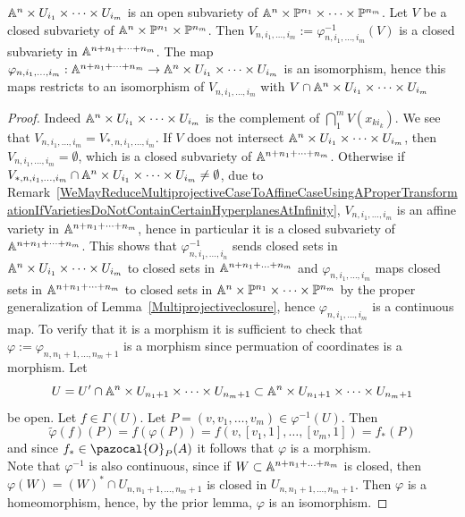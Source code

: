     \begin{lemma}\label{IdentificationOfAffineCoverOfMultiprojectiveSpaceWithAffineSpaceIsIsomorphism}
        $\mathbb{A}^n\times U_{i_1}\times \cdots\times U_{i_m}$ is an open subvariety of $\mathbb{A}^n\times \mathbb{P}^{n_1}\times \cdots \times \mathbb{P}^{n_m}$. Let $V$ be a closed subvariety of $\mathbb{A}^n\times \mathbb{P}^{n_1}\times \mathbb{P}^{n_m}$. Then $V_{n,i_1,\dots,i_m} := \varphi_{n,i_1,\dots,i_m}^{-1}(V)$ is a closed subvariety in $\A^{n+n_1+\dots+n_m}$. The map $\varphi_{n,i_1,\dots,i_m} : \mathbb{A}^{n+n_1+\dots+n_m} \rightarrow \mathbb{A}^n\times U_{i_1}\times \cdots \times U_{i_m}$ is an isomorphism, hence this maps restricts to an isomorphism of $V_{n,i_1,\dots,i_m}$ with $V\cap \mathbb{A}^n\times U_{i_1}\times \cdots \times U_{i_m}$ 
    \end{lemma}
    \begin{proof}
        Indeed $\mathbb{A}^n\times U_{i_1}\times \cdots\times U_{i_m}$ is the complement of $\bigcap_1^m V(x_{ki_k})$. We see that $V_{n,i_1,\dots,i_m} = V_{\ast,n, i_1,\dots,i_m}$. If $V$ does not intersect $\mathbb{A}^n\times U_{i_1}\times\cdots \times U_{i_m}$, then $V_{n,i_1,\dots,i_m} = \emptyset$, which is a closed subvariety of $\A^{n+n_1+\dots+n_m}$. Otherwise if $V_{\ast,n,i_1,\dots,i_m}\cap \mathbb{A}^n\times U_{i_1}\times \cdots \times U_{i_m}\neq \emptyset$, due to Remark~\ref{WeMayReduceMultiprojectiveCaseToAffineCaseUsingAProperTransformationIfVarietiesDoNotContainCertainHyperplanesAtInfinity}, $V_{n,i_1,\dots,i_m}$ is an affine variety in $\A^{n+n_1+\dots+n_m}$, hence in particular it is a closed subvariety of $\A^{n+n_1+\dots+n_m}$. This shows that $\varphi_{n,i_1,\dots,i_n}^{-1}$ sends closed sets in $\mathbb{A}^n\times U_{i_1}\times \cdots \times U_{i_m}$ to closed sets in $\A^{n+n_1+\dots +n_m}$ and $\varphi_{n,i_1,\dots,i_m}$ maps closed sets in $\A^{n+n_1+\dots+n_m}$ to closed sets in $\mathbb{A}^n\times \mathbb{P}^{n_1}\times\cdots \times  \mathbb{P}^{n_m}$ by the proper generalization of Lemma~\ref{Multiprojectiveclosure}, hence $\varphi_{n,i_1,\dots,i_m}$ is a continuous map. To verify that it is a morphism it is sufficient to check that $\varphi:=\varphi_{n,n_1+1,\dots,n_{m}+1}$ is a morphism since permuation of coordinates is a morphism. Let 
        $$
            U=U'\cap \mathbb{A}^n\times U_{n_1+1}\times \cdots \times U_{n_m+1}\subset \mathbb{A}^n\times U_{n_1+1}\times \cdots \times U_{n_m+1}
        $$ 
        be open. Let $f\in\Gamma(U)$. Let $P=(v,v_1,\dots,v_m)\in \varphi^{-1}(U)$. Then 
        $$
            \widetilde{\varphi}(f)(P) = f(\varphi(P))=f(v,[v_1,1],\dots,[v_m,1]) = f_\ast(P)
        $$ 
        and since $f_\ast \in \pazocal{O}_{P}(A)$ it follows that $\varphi$ is a morphism.\\
        Note that $\varphi^{-1}$ is also continuous, since if $W\subset \mathbb{A}^{n+n_1+\dots +n_m}$ is closed, then $\varphi(W)=(W)^\ast\cap U_{n,n_1+1,\dots,n_m+1}$ is closed in $U_{n,n_1+1,\dots,n_m+1}$. Then $\varphi$ is a homeomorphism, hence, by the prior lemma, $\varphi$ is an isomorphism.    
    \end{proof}

